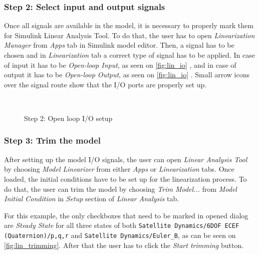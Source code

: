     \subsubsection*{Step 2: Select input and output signals}

        Once all signals are available in the model, it is necessary to properly mark them for Simulink Linear Analysis Tool. To do that, the user has to open \textit{Linearization Manager} from \textit{Apps} tab in Simulink model editor. Then, a signal has to be chosen and in \textit{Linearization} tab a correct type of signal has to be applied. In case of input it has to be \textit{Open-loop Input}, as seen on \autoref{fig:lin_io} , and in case of output it has to be \textit{Open-loop Output}, as seen on \autoref{fig:lin_io} . Small arrow icons over the signal route show that the I/O ports are properly set up.

        \begin{figure}[H]
            \centering
            \\
            \caption{Step 2: Open loop I/O setup}%
            \label{fig:lin_io}%
        \end{figure}

        

    \subsubsection*{Step 3: Trim the model}
        After setting up the model I/O signals, the user can open \textit{Linear Analysis Tool} by choosing \textit{Model Linearizer} from either \textit{Apps} or \textit{Linearization} tabs. Once loaded, the initial conditions have to be set up for the linearization process. To do that, the user can trim the model by choosing \textit{Trim Model...} from \textit{Model Initial Condition} in \textit{Setup} section of \textit{Linear Analysis} tab.
         
        For this example, the only checkboxes that need to be marked in opened dialog are \textit{Steady State} for all three states of both \verb|Satellite Dynamics/6DOF ECEF (Quaternion)/p,q,r| and \verb|Satellite Dynamics/Euler_B|, as can be seen on \autoref{fig:lin_trimming}. After that the user has to click the \textit{Start trimming} button.

